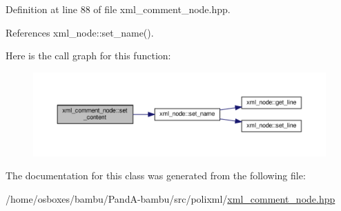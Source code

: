 Definition at line 88 of file xml\+\_\+comment\+\_\+node.\+hpp.



References xml\+\_\+node\+::set\+\_\+name().

Here is the call graph for this function\+:
\nopagebreak
\begin{figure}[H]
\begin{center}
\leavevmode
\includegraphics[width=350pt]{dc/d8b/classxml__comment__node_a4f34eb5787506cbfb784fb7c5f927423_cgraph}
\end{center}
\end{figure}


The documentation for this class was generated from the following file\+:\begin{DoxyCompactItemize}
\item 
/home/osboxes/bambu/\+Pand\+A-\/bambu/src/polixml/\hyperlink{xml__comment__node_8hpp}{xml\+\_\+comment\+\_\+node.\+hpp}\end{DoxyCompactItemize}
